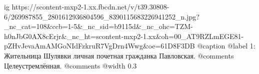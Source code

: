  
 
 
 
 

\ifcmt
  ig https://scontent-mxp2-1.xx.fbcdn.net/v/t39.30808-6/269987855_2801612936804596_8390115683226941252_n.jpg?_nc_cat=108&ccb=1-5&_nc_sid=b9115d&_nc_ohc=TZM-h0nJbG0AX8cErjr&_nc_ht=scontent-mxp2-1.xx&oh=00_AT9RZLmEGE81-pZHvJevaAmAMGoNIdFzkruR7VgDrn4Wwg&oe=61D8F3DB
	@caption @label 1: Жительница Шулявки личная почетная гражданка Павловская.
	@comments%
    Целеустремлённая.
	@comments%
  @width 0.3
\fi
